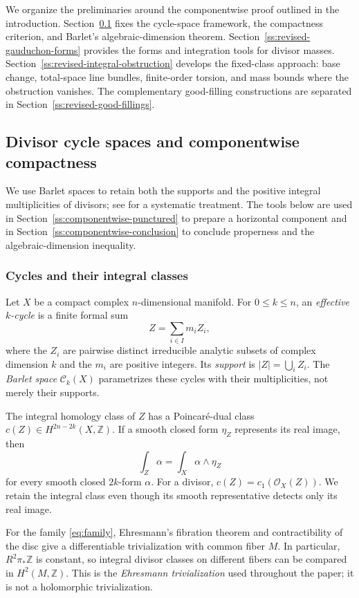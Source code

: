 \documentclass[11pt]{amsart}
\numberwithin{equation}{section}
\theoremstyle{plain}
\theoremstyle{definition}
\newcommand{\Z}{\mathbb Z}
\newcommand{\cC}{\mathcal C}
\newcommand{\cO}{\mathcal O}
\begin{document}
We organize the preliminaries around the componentwise proof outlined
in the introduction.  Section~\ref{ss:revised-cycle-tools} fixes the
cycle-space framework, the compactness criterion, and Barlet's
algebraic-dimension theorem.  Section~\ref{ss:revised-gauduchon-forms}
provides the forms and integration tools for divisor masses.
Section~\ref{ss:revised-integral-obstruction} develops the fixed-class
approach: base change, total-space line bundles, finite-order torsion,
and mass bounds where the obstruction vanishes.  The complementary
good-filling constructions are separated in
Section~\ref{ss:revised-good-fillings}.

\subsection{Divisor cycle spaces and componentwise compactness}
\label{ss:revised-cycle-tools}

We use Barlet spaces to retain both the supports and the positive
integral multiplicities of divisors; see \cite{BM19} for a systematic
treatment.  The tools below are used in
Section~\ref{ss:componentwise-punctured} to prepare a horizontal
component and in Section~\ref{ss:componentwise-conclusion} to conclude
properness and the algebraic-dimension inequality.

\subsubsection{Cycles and their integral classes}
Let $X$ be a compact complex $n$-dimensional manifold.  For
$0\le k\le n$, an \emph{effective $k$-cycle} is a finite formal sum
\[
 Z=\sum_{i\in I}m_iZ_i,
\]
where the $Z_i$ are pairwise distinct irreducible analytic subsets of
complex dimension $k$ and the $m_i$ are positive integers.  Its \emph{support}
is $|Z|=\bigcup_iZ_i$.  The \emph{Barlet space} $\cC_k(X)$ parametrizes these
cycles with their multiplicities, not merely their supports.

The integral homology class of $Z$ has a Poincar\'e-dual class
$c(Z)\in H^{2n-2k}(X,\Z)$.  If a smooth closed form $\eta_Z$
represents its real image, then
\[
 \int_Z\alpha=\int_X\alpha\wedge\eta_Z
\]
for every smooth closed $2k$-form $\alpha$.  For a divisor,
$c(Z)=c_1(\cO_X(Z))$.  We retain the integral class even though its
smooth representative detects only its real image.

For the family \eqref{eq:family}, Ehresmann's fibration theorem
\cite{Eh47} and contractibility of the disc give a differentiable
trivialization with common fiber $M$.  In particular, $R^2\pi_*\Z$ is
constant, so integral divisor classes on different fibers can be compared
in $H^2(M,\Z)$.  This is the \emph{Ehresmann trivialization} used
throughout the paper; it is not a holomorphic trivialization.
\end{document}
